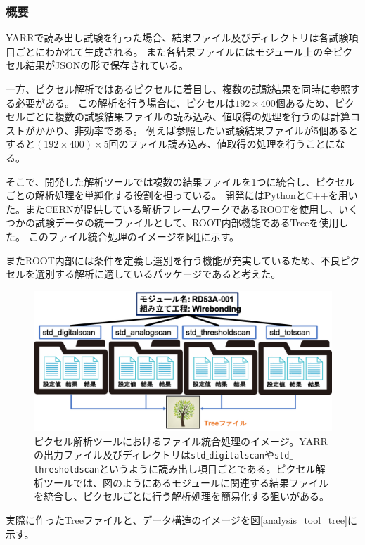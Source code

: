 \subsubsection{概要}
YARRで読み出し試験を行った場合、結果ファイル及びディレクトリは各試験項目ごとにわかれて生成される。
また各結果ファイルにはモジュール上の全ピクセル結果がJSONの形で保存されている。

一方、ピクセル解析ではあるピクセルに着目し、複数の試験結果を同時に参照する必要がある。
この解析を行う場合に、ピクセルは$192\times 400$個あるため、ピクセルごとに複数の試験結果ファイルの読み込み、値取得の処理を行うのは計算コストがかかり、非効率である。
例えば参照したい試験結果ファイルが5個あるとすると$(192\times 400)\times 5$回のファイル読み込み、値取得の処理を行うことになる。

そこで、開発した解析ツールでは複数の結果ファイルを1つに統合し、ピクセルごとの解析処理を単純化する役割を担っている。
開発にはPythonとC++を用いた。またCERNが提供している解析フレームワークであるROOT\cite{4-5}を使用し、いくつかの試験データの統一ファイルとして、ROOT内部機能であるTreeを使用した。
このファイル統合処理のイメージを図\ref{analysis_tool_motivation}に示す。

またROOT内部には条件を定義し選別を行う機能が充実しているため、不良ピクセルを選別する解析に適しているパッケージであると考えた。

\begin{figure}[bpt]\centering
\includegraphics[width=12cm]{./analysis_tool_motivation.png}
\caption[ピクセル解析ツールにおけるファイル統合処理のイメージ]{ピクセル解析ツールにおけるファイル統合処理のイメージ。YARRの出力ファイル及びディレクトリは\texttt{std$\_$digitalscan}や\texttt{std$\_$thresholdscan}というように読み出し項目ごとである。ピクセル解析ツールでは、図のようにあるモジュールに関連する結果ファイルを統合し、ピクセルごとに行う解析処理を簡易化する狙いがある。}
\label{analysis_tool_motivation}
\end{figure}

実際に作ったTreeファイルと、データ構造のイメージを図\ref{analysis_tool_tree}に示す。


